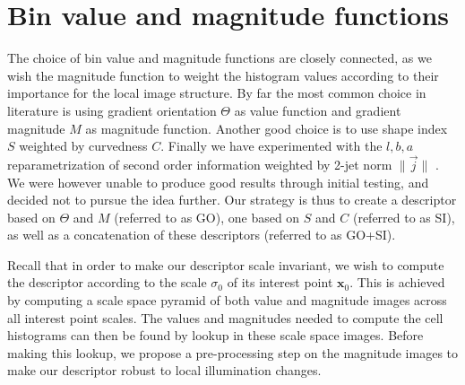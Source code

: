 \documentclass[thesis.tex]{subfiles}
\def\x{\mathbf{x}}
\begin{document}
\section{Bin value and magnitude functions}
\label{sec:valueMagnitudeFunctions}
%
The choice of bin value and magnitude functions are closely connected, as we wish the magnitude function to weight the histogram values according to their importance for the local image structure. By far the most common choice in literature \cite{lowe2004distinctive,ke2004pca,mikolajczyk2005performance,tola2008fast} is using gradient orientation $\Theta$ as value function and gradient magnitude $M$ as magnitude function. Another good choice \cite{pedersen2013shape} is to use shape index $S$ weighted by curvedness $C$. Finally we have experimented with the $l,b,a$ reparametrization of second order information weighted by 2-jet norm $\| \overset{\rightarrow}{j} \|$ \citep{griffin2007second}. We were however unable to produce good results through initial testing, and decided not to pursue the idea further. Our strategy is thus to create a descriptor based on $\Theta$ and $M$ (referred to as GO), one based on $S$ and $C$ (referred to as SI), as well as a concatenation of these descriptors (referred to as GO+SI).

Recall that in order to make our descriptor scale invariant, we wish to compute the descriptor according to the scale $\sigma_0$ of its interest point $\x_0$. This is achieved by computing a scale space pyramid of both value and magnitude images across all interest point scales. The values and magnitudes needed to compute the cell histograms can then be found by lookup in these scale space images. Before making this lookup, we propose a pre-processing step on the magnitude images to make our descriptor robust to local illumination changes.
%
\end{document}
